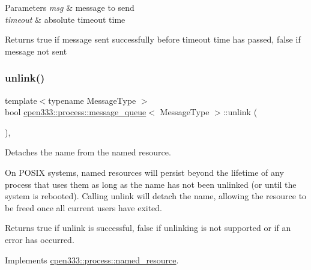 \begin{DoxyParams}{Parameters}
{\em msg} & message to send \\
\hline
{\em timeout} & absolute timeout time \\
\hline
\end{DoxyParams}
\begin{DoxyReturn}{Returns}
{\ttfamily true} if message sent successfully before timeout time has passed, {\ttfamily false} if message not sent 
\end{DoxyReturn}
\mbox{\label{classcpen333_1_1process_1_1message__queue_ae94a6503dff948dfc2533f7786839dca}} 
\subsubsection{\texorpdfstring{unlink()}{unlink()}\hspace{0.1cm}{\footnotesize\ttfamily [1/2]}}
{\footnotesize\ttfamily template$<$typename Message\+Type $>$ \\
bool \hyperlink{classcpen333_1_1process_1_1message__queue}{cpen333\+::process\+::message\+\_\+queue}$<$ Message\+Type $>$\+::unlink (\begin{DoxyParamCaption}{ }\end{DoxyParamCaption})\hspace{0.3cm}{\ttfamily [inline]}, {\ttfamily [virtual]}}



Detaches the name from the named resource. 

On P\+O\+S\+IX systems, named resources will persist beyond the lifetime of any process that uses them as long as the name has not been unlinked (or until the system is rebooted). Calling {\ttfamily unlink} will detach the name, allowing the resource to be freed once all current users have exited.

\begin{DoxyReturn}{Returns}
{\ttfamily true} if unlink is successful, {\ttfamily false} if unlinking is not supported or if an error has occurred. 
\end{DoxyReturn}


Implements \hyperlink{classcpen333_1_1process_1_1named__resource_a5d33168fee48c9b0c58ab8fd96e230ce}{cpen333\+::process\+::named\+\_\+resource}.

